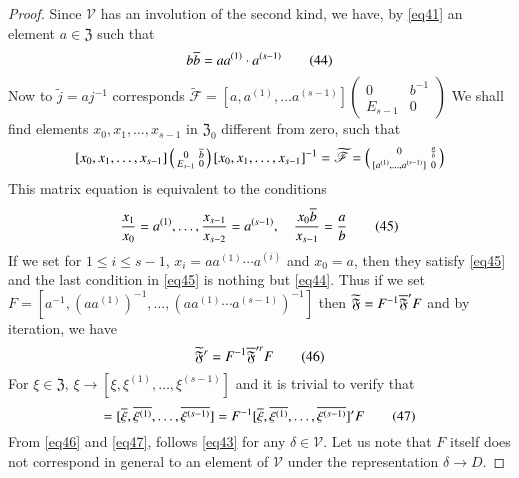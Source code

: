 \begin{proof}
Since $\mathscr{V}$ has an involution of the second kind, we have, by
\eqref{eq41} an element $a \in \mathfrak{Z}$ such that
\begin{equation*}
b \overline{b} = aa^{(1)}\cdot a^{(s-1)} \tag{44}\label{eq44}
\end{equation*}
Now to $\widetilde{j} = a j^{-1}$ corresponds $\widetilde{\mathscr{F}}
= [a,a^{(1)},\ldots  a^{(s-1)}]  
\left(\begin{smallmatrix} 0 & b^{-1}\\ E_{s-1} &
  0\end{smallmatrix}\right)$  
We shall find elements $x_0, x_1,\ldots, x_{s-1}$ in $\mathfrak{Z}_0$
different from zero, such that 
$$
[x_0, x_1, \ldots, x_{s-1}]
\left(\begin{smallmatrix} 0 & \overline{b} \\ E_{s-1} &
  0 \end{smallmatrix}\right) [x_0,x_1,\ldots, x_{s-1}]^{-1} =
\widetilde{\mathscr{F}} =
\left(\begin{smallmatrix}
 0 & \frac{a}{b} \\ 
[a^{(1)},\ldots,  a^{(s-1)}] & 0 
\end{smallmatrix}\right) 
$$
This \pageoriginale matrix equation is equivalent to the conditions
\begin{equation*}
\frac{x_1}{x_0} = a^{(1)},\ldots, \frac{x_{s-1}}{x_{s-2}} = a^{(s-1)},
\quad \frac{x_0 \overline{b}}{x_{s-1}} = \frac{a}{b} \tag{45}\label{eq45}
\end{equation*}
If we set for $1\leq i \leq s-1$, $x_i = a a^{(1)}\cdots a^{(i)}$ and
$x_0=a$, then they satisfy \eqref{eq45} and the last condition in \eqref{eq45} is
nothing but \eqref{eq44}. Thus if we set $ F=[a^{-1}, (aa^{(1)})^{-1}, \ldots,
  (a a^{(1)}\cdots a^{(s-1)})^{-1}]$ then $\widetilde{\mathfrak{F}} =
F^{-1} \overline{\mathfrak{F}}'F$ and by iteration, we have
\begin{equation*}
\widetilde{\mathfrak{F}}^r = F^{-1} \overline{\mathfrak{F}}'^r F \tag{46}\label{eq46}
\end{equation*}
For $\xi \in \mathfrak{Z}$, $\xi \rightarrow [\xi,
  \xi^{(1)},\ldots, \xi^{(s-1)}]$ and it is trivial to verify that
\begin{equation*}
[\widetilde{\xi}, \widetilde{\xi^{(1)}}, \ldots,
  \widetilde{\xi^{(s-1)}}] = [\ob{\xi}, \ob{\xi^{(1)}},\ldots,
  \ob{\xi^{(s-1)}}] = F^{-1} [\ob{\xi}, \ob{\xi^{(1)}},\ldots,
  \ob{\xi^{(s-1)}}]'F \tag{47}\label{eq47}
\end{equation*}
From \eqref{eq46} and \eqref{eq47}, follows \eqref{eq43} for any $\delta \in 
\mathscr{V}$. Let us note that $F$ itself does not correspond in general to an element
of $\mathscr{V}$ under the representation $\delta \rightarrow D$.


\end{proof}
